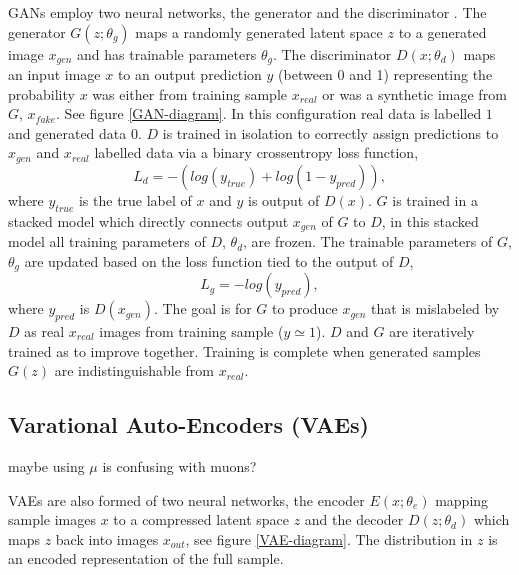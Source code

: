 \documentclass{article}
\begin{document}
        GANs employ two neural networks, the generator and the discriminator \cite{goodfellow2014generative}. The generator $G(z;\theta_g)$ maps a randomly generated latent space $z$ to a generated image $x_{gen}$ and has trainable parameters $\theta_g$. The discriminator $D(x;\theta_d)$ maps an input image $x$ to an output prediction $y$ (between 0 and 1) representing the probability $x$ was either from training sample $x_{real}$ or was a synthetic image from $G$, $x_{fake}$. See figure \ref{GAN-diagram}. In this configuration real data is labelled $1$ and generated data $0$. $D$ is trained in isolation to correctly assign predictions to $x_{gen}$ and $x_{real}$ labelled data via a binary crossentropy loss function,
        \begin{equation}
            L_d = -(log(y_{true}) + log(1 - y_{pred})),
        \end{equation}
        where $y_{true}$ is the true label of $x$ and $y$ is output of $D(x)$. $G$ is trained in a stacked model which directly connects output $x_{gen}$ of $G$ to $D$, in this stacked model all training parameters of $D$, $\theta_d$, are frozen. The trainable parameters of $G$, $\theta_g$ are updated based on the loss function tied to the output of $D$, 
        \begin{equation}
            L_g = -log(y_{pred}),
        \end{equation}
        where $y_{pred}$ is $D(x_{gen})$. The goal is for $G$ to produce $x_{gen}$ that is mislabeled by $D$ as real $x_{real}$ images from training sample ($y\simeq1$). $D$ and $G$ are iteratively trained as to improve together. Training is complete when generated samples $G(z)$ are indistinguishable from $x_{real}$.
    
    \subsection{Varational Auto-Encoders (VAEs)}\label{VAEs}
    
        
        maybe using $\mu$ is confusing with muons?
        
        VAEs are also formed of two neural networks, the encoder $E(x;\theta_e)$ mapping sample images $x$ to a compressed latent space $z$ and the decoder $D(z;\theta_d)$ which maps $z$ back into images $x_{out}$, see figure \ref{VAE-diagram}. The distribution in $z$ is an encoded representation of the full sample.%
        
\end{document}
